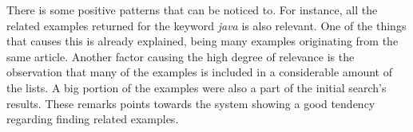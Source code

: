 There is some positive patterns that can be noticed to. For instance, all the related examples returned for the keyword \textit{java} is also relevant. One of the things that causes this is already explained, being many examples originating from the same article. Another factor causing the high degree of relevance is the observation that many of the examples is included in a considerable amount of the lists. A big portion of the examples were also a part of the initial search's results. These remarks points towards the system showing a good tendency regarding finding related examples.


\cleardoublepage